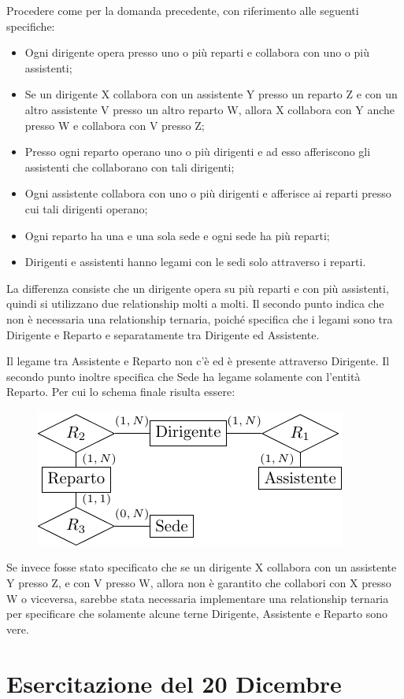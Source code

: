\documentclass{article}
\numberwithin{equation}{subsection}
\begin{document}
Procedere come per la domanda precedente, con riferimento alle seguenti specifiche:
\begin{itemize}
    \item Ogni dirigente opera presso uno o più reparti e collabora con uno o più assistenti;
    \item Se un dirigente X collabora con un assistente Y presso un reparto Z e con un altro assistente V presso un
    altro reparto W, allora X collabora con Y anche presso W e collabora con V presso Z;
    \item Presso ogni reparto operano uno o più dirigenti e ad esso afferiscono gli assistenti che collaborano con tali
    dirigenti;
    \item Ogni assistente collabora con uno o più dirigenti e afferisce ai reparti presso cui tali dirigenti operano;
    \item Ogni reparto ha una e una sola sede e ogni sede ha più reparti;
    \item Dirigenti e assistenti hanno legami con le sedi solo attraverso i reparti. 
\end{itemize}

La differenza consiste che un dirigente opera su più reparti e con più assistenti, quindi si utilizzano due relationship molti a molti. Il secondo punto indica che non è necessaria una relationship ternaria, poiché specifica che i legami sono tra Dirigente e Reparto e separatamente tra Dirigente ed Assistente. 

Il legame tra Assistente e Reparto non c'è ed è presente attraverso Dirigente. Il secondo punto inoltre specifica che Sede ha legame solamente con l'entità Reparto. Per cui lo schema finale risulta essere:

\begin{figure}[H]%
    \centering%
    \includegraphics[scale=1.2]{schema_6_16-12-24.pdf}%
\end{figure}


Se invece fosse stato specificato che se un dirigente X collabora con un assistente Y presso Z, e con V presso W, allora non è garantito che collabori con X presso W o viceversa, sarebbe stata necessaria implementare una relationship ternaria per specificare che solamente alcune terne Dirigente, Assistente e Reparto sono vere. 

\clearpage

\section{Esercitazione del 20 Dicembre}


\clearpage
\end{document}
